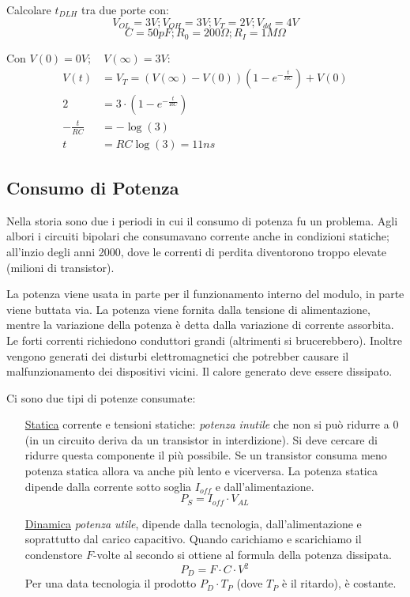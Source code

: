 \documentclass[12pt]{article}
\begin{document}
\begin{example}{}{}
    Calcolare $t_{DLH}$ tra due porte con:
    \[ V_{OL}=3V; V_{OH}=3V; V_T=2V; V_{dd}=4V\]
    \[ C=50pF; R_0=200\Omega; R_I=1M\Omega \]
    
    Con  $V(0)=0V;\quad V(\infty)=3V$:
    \begin{align*}
        V(t) & = V_T = (V(\infty) - V(0))(1-e^{-\frac{t}{RC}}) + V(0) \\
        2 & = 3 \cdot (1-e^{-\frac{t}{RC}}) \\
        -\frac{t}{RC} & = -\log(3) \\
        t & = RC \log(3) = \boxed{11 ns}
    \end{align*}
\end{example}


\subsection{Consumo di Potenza}
Nella storia sono due i periodi in cui il consumo di potenza fu un problema. Agli albori i circuiti bipolari che consumavano corrente anche in condizioni statiche; all'inzio degli anni 2000, dove le correnti di perdita diventorono troppo elevate (milioni di transistor).

La potenza viene usata in parte per il funzionamento interno del modulo, in parte viene buttata via. La potenza viene fornita dalla tensione di alimentazione, mentre la variazione della potenza \`e detta dalla variazione di corrente assorbita. Le forti correnti richiedono conduttori grandi (altrimenti si brucerebbero). Inoltre vengono generati dei disturbi elettromagnetici che potrebber causare il malfunzionamento dei dispositivi vicini. Il calore generato deve essere dissipato.

Ci sono due tipi di potenze consumate:
\begin{itemize}
    \item[\underline{Statica}] corrente e tensioni statiche: \emph{potenza inutile} che non si pu\`o ridurre a $0$ (in un circuito deriva da un transistor in interdizione). Si deve cercare di ridurre questa componente il pi\`u possibile. Se un transistor consuma meno potenza statica allora va anche pi\`u lento e vicerversa. La potenza statica dipende dalla corrente sotto soglia  $I_{off}$ e dall'alimentazione.
        \begin{equation}\label{eq:potenza-statica}
            P_S = I_{off} \cdot V_{AL}
        \end{equation}
    \item[\underline{Dinamica}] \emph{potenza utile}, dipende dalla tecnologia, dall'alimentazione e soprattutto dal carico capacitivo. Quando carichiamo e scarichiamo il condenstore $F$-volte al secondo si ottiene al formula della potenza dissipata.
        \begin{equation}\label{eq:potenza-dinamica}
            P_D = F \cdot C \cdot V^2
        \end{equation}
        Per una data tecnologia il prodotto $P_D \cdot T_P$ (dove $T_P$ \`e il ritardo), \`e costante.
\end{itemize}
\end{document}
